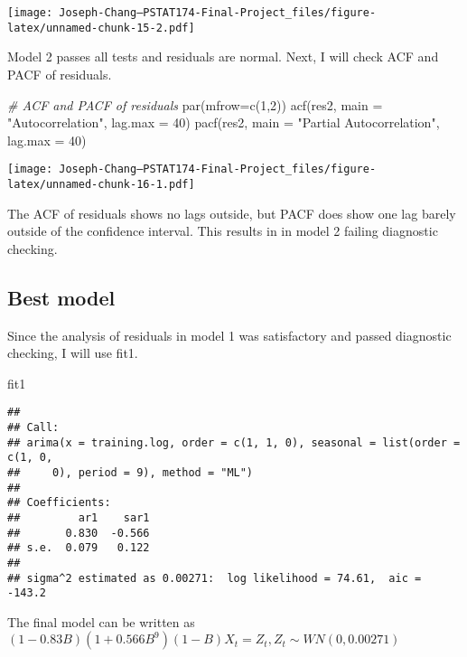 \documentclass[
]{article}
\newenvironment{Shaded}{\begin{snugshade}}{\end{snugshade}}
\newcommand{\AttributeTok}[1]{\textcolor[rgb]{0.77,0.63,0.00}{#1}}
\newcommand{\CommentTok}[1]{\textcolor[rgb]{0.56,0.35,0.01}{\textit{#1}}}
\newcommand{\DecValTok}[1]{\textcolor[rgb]{0.00,0.00,0.81}{#1}}
\newcommand{\FunctionTok}[1]{\textcolor[rgb]{0.00,0.00,0.00}{#1}}
\newcommand{\NormalTok}[1]{#1}
\newcommand{\StringTok}[1]{\textcolor[rgb]{0.31,0.60,0.02}{#1}}
\begin{document}
\texttt{[image: Joseph-Chang---PSTAT174-Final-Project\_files/figure-latex/unnamed-chunk-15-2.pdf]}

Model 2 passes all tests and residuals are normal. Next, I will check
ACF and PACF of residuals.

\begin{Shaded}
\begin{Highlighting}[]
\CommentTok{\# ACF and PACF of residuals}
\FunctionTok{par}\NormalTok{(}\AttributeTok{mfrow=}\FunctionTok{c}\NormalTok{(}\DecValTok{1}\NormalTok{,}\DecValTok{2}\NormalTok{))}
\FunctionTok{acf}\NormalTok{(res2, }\AttributeTok{main =} \StringTok{"Autocorrelation"}\NormalTok{, }\AttributeTok{lag.max =} \DecValTok{40}\NormalTok{)}
\FunctionTok{pacf}\NormalTok{(res2, }\AttributeTok{main =} \StringTok{"Partial Autocorrelation"}\NormalTok{, }\AttributeTok{lag.max =} \DecValTok{40}\NormalTok{)}
\end{Highlighting}
\end{Shaded}

\texttt{[image: Joseph-Chang---PSTAT174-Final-Project\_files/figure-latex/unnamed-chunk-16-1.pdf]}

The ACF of residuals shows no lags outside, but PACF does show one lag
barely outside of the confidence interval. This results in in model 2
failing diagnostic checking.

\hypertarget{best-model}{%
\subsection{Best model}\label{best-model}}

Since the analysis of residuals in model 1 was satisfactory and passed
diagnostic checking, I will use fit1.

\begin{Shaded}
\begin{Highlighting}[]
\NormalTok{fit1}
\end{Highlighting}
\end{Shaded}

\begin{verbatim}
## 
## Call:
## arima(x = training.log, order = c(1, 1, 0), seasonal = list(order = c(1, 0, 
##     0), period = 9), method = "ML")
## 
## Coefficients:
##         ar1    sar1
##       0.830  -0.566
## s.e.  0.079   0.122
## 
## sigma^2 estimated as 0.00271:  log likelihood = 74.61,  aic = -143.2
\end{verbatim}

The final model can be written as
\((1-0.83B)(1+0.566B^9)(1-B)X_t = Z_t, Z_t \sim WN(0, 0.00271)\)
\end{document}
